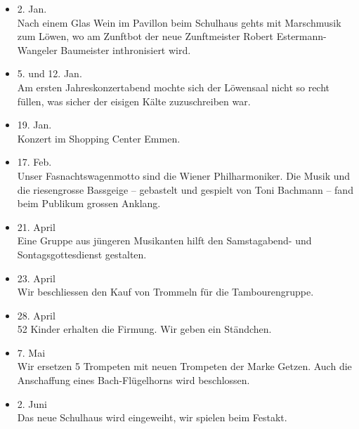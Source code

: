 \begin{multicols}{2}


    \begin{itemize}

        \item[]2. Jan.\\
        Nach einem Glas Wein im Pavillon beim Schulhaus gehts mit Marschmusik
        zum Löwen, wo am Zunftbot der neue Zunftmeister Robert
        Estermann-Wangeler Baumeister inthronisiert wird.

        \item[]5. und 12. Jan.\\
        Am ersten Jahreskonzertabend mochte sich der Löwensaal nicht so recht
        füllen, was sicher der eisigen Kälte zuzuschreiben war.

        \item[]19. Jan.\\
        Konzert im Shopping Center Emmen.

        \item[]17. Feb.\\
        Unser Fasnachtswagenmotto sind die Wiener Philharmoniker. Die Musik und
        die riesengrosse Bassgeige -- gebastelt und gespielt von Toni Bachmann
        -- fand beim Publikum grossen Anklang.

        \item[]21. April\\
        Eine Gruppe aus jüngeren Musikanten hilft den Samstagabend- und
        Sontagsgottesdienst gestalten.

        \item[]23. April\\
        Wir beschliessen den Kauf von Trommeln für die Tambourengruppe.

        \item[]28. April\\
        52 Kinder erhalten die Firmung. Wir geben ein Ständchen.

        \item[]7. Mai\\
        Wir ersetzen 5 Trompeten mit neuen Trompeten der Marke Getzen. Auch die
        Anschaffung eines Bach-Flügelhorns wird beschlossen.

        \item[]2. Juni\\
        Das neue Schulhaus wird eingeweiht, wir spielen beim Festakt.


\end{itemize}
\end{multicols}
